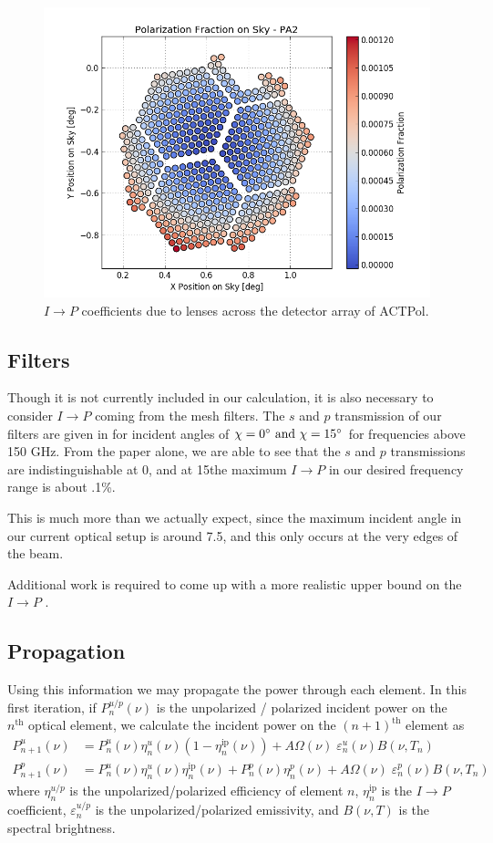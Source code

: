 \documentclass{article}
\theoremstyle{remark}
\newcommand{\tab}{\hspace*{2em}}
\renewcommand{\t}[1]{\text{#1}}
\newcommand{\ip}{$I\rightarrow P$ }
\begin{document}
\begin{figure}[t!]
	\centering
  \includegraphics[width=.8\linewidth]{images/pa2_polarization_fraction.png}
  \caption{$I\rightarrow P$ coefficients due to lenses across the detector array of ACTPol.}
  \label{fig:IP-array}
\end{figure}

\subsection*{Filters}
\tab Though it is not currently included in our calculation, it is also necessary to consider \ip coming from the mesh filters. 
The $s$ and $p$ transmission of our filters are given in \cite{pisano_polarisation_2006} for incident angles of 
$\chi = 0\degree \t{ and } \chi = 15\degree$ for frequencies above 150 GHz.
From the paper alone, we are able to see that the $s$ and $p$ transmissions are indistinguishable at 0\degree, 
and at 15\degree the maximum \ip in our desired frequency range is about .1\%.

\tab This is much more than we actually expect, since the maximum incident angle in our current optical setup is 
around 7.5\degree, and this only occurs at the very edges of the beam.

Additional work is required to come up with a more realistic upper bound on the \ip.


\subsection*{Propagation}
\tab Using this information we may propagate the power through each element.
In this first iteration, if $P_{n}^{u/p}(\nu)$ is the unpolarized / polarized incident power on the $n^\t{th}$ optical element, 
we calculate the incident power on the $(n+1)^\t{th}$ element as
\begin{align}
P_{n+1}^u(\nu) &= P_n^u(\nu) \eta_n^u(\nu) (1 - \eta_n^{\t{ip}}(\nu)) + A\Omega(\nu) \; \varepsilon_n^u(\nu) B(\nu,T_n)\\
P_{n+1}^p(\nu) &= P_n^u(\nu) \eta_n^u(\nu) \eta_n^{\t{ip}}(\nu) +  P_n^p(\nu) \eta_n^p(\nu) + A\Omega(\nu) \; \varepsilon_n^p(\nu) B(\nu,T_n)
\end{align}
where $\eta_n^{u/p}$ is the unpolarized/polarized efficiency of element $n$, $\eta_n^\t{ip}$ is the \ip coefficient, $\varepsilon_n^{u/p}$
is the unpolarized/polarized emissivity, and $B(\nu,T)$ is the spectral brightness.
\end{document}
